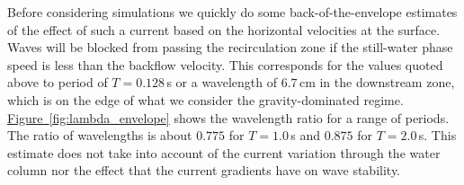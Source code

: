 %
%


Before considering simulations we quickly do some back-of-the-envelope estimates of the effect of such a current based on the horizontal velocities at the surface.
Waves will be blocked from passing the recirculation zone if the still-water phase speed is less than the backflow velocity. 
This corresponds for the values quoted above to period of $T=0.128$\,s or a wavelength of $6.7$\,cm in the downstream zone, which is on the edge of what we consider the gravity-dominated regime. 
\href{fig:lambda_envelope}{Figure~\ref*{fig:lambda_envelope}} shows the wavelength ratio for a range of periods.
The ratio of wavelengths is about $0.775$ for $T=1.0$\,s and $0.875$ for $T=2.0$\,s.
This estimate does not take into account of the current variation through the water column nor the effect that the current gradients have on wave stability.

